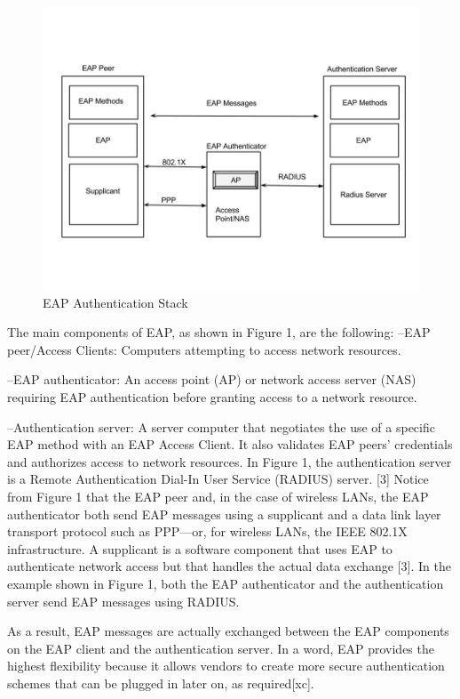 \begin{figure}[htb]
\centering	
\includegraphics[width=1\textwidth]{images/EAP_overview.jpg}
\caption{EAP Authentication Stack} 
\label{fig:EAP Authentication Stack}
\end{figure}

The main components of EAP, as shown in Figure 1, are the following:
--EAP peer/Access Clients: Computers attempting to access network resources.

--EAP authenticator: An access point (AP) or network access server (NAS) requiring EAP authentication before granting access to a network resource.

--Authentication server: A server computer that negotiates the use of a specific EAP method with an EAP Access Client. It also validates EAP peers’ credentials and authorizes access to network resources. In Figure 1, the authentication server is a Remote Authentication Dial-In User Service (RADIUS) server. [3] Notice from Figure 1 that the EAP peer and, in the case of wireless LANs, the EAP authenticator both send EAP messages using a supplicant and a data link layer transport protocol such as PPP—or, for wireless LANs, the IEEE 802.1X infrastructure. A supplicant is a software component that uses EAP to authenticate network access but that handles the actual data exchange [3]. In the example shown in Figure 1, both the EAP authenticator and the authentication server send EAP messages using
RADIUS. 

As a result, EAP messages are actually exchanged between the EAP components on the EAP client and the authentication server. In a word, EAP provides the highest flexibility because it allows vendors to create more secure authentication schemes that can be plugged in later on, as required[xc].

